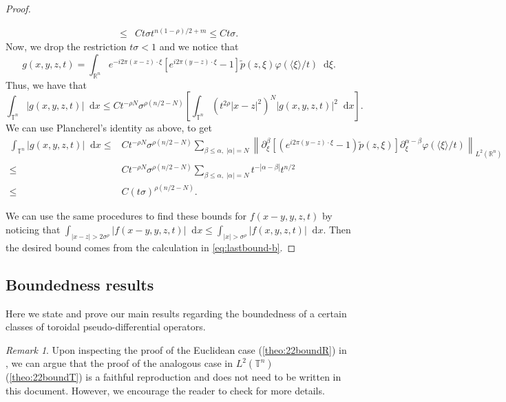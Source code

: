 \documentclass[12pt, reqno]{amsart}
\theoremstyle{definition}
\theoremstyle{remark}
\newtheorem{remark}[theorem]{Remark}
\numberwithin{equation}{section}
\newcommand*\diff{\mathop{}\!\mathrm{d}}
\begin{document}
\begin{proof}
\begin{itemize}
\begin{align*}
            \leq& Ct\sigma t^{n(1-\rho)/2 + m} \leq Ct\sigma.
        \end{align*}
        Now, we drop the restriction $t\sigma<1$ and we notice that
        \begin{equation*}
            g(x, y, z, t) = \int_{\mathbb{R}^n} e^{-i2\pi (x-z) \cdot \xi} \left[ e^{i2\pi (y-z) \cdot \xi} -1 \right]\tilde{p}(z, \xi)\varphi(\langle\xi\rangle/t) \diff \xi.
        \end{equation*}
        Thus, we have that
        \begin{equation*}
            \int_{\mathbb{T}^n} |g(x, y, z, t)|\diff x \leq Ct^{-\rho N}\sigma^{\rho(n/2 - N)} \left[ \int_{\mathbb{T}^n} (t^{2\rho}|x-z|^2)^N|g(x, y, z, t)|^2\diff x \right].
        \end{equation*}
        We can use Plancherel's identity as above, to get
        \begin{align*}
            \int_{\mathbb{T}^n} |g(x, y, z, t)|\diff x \leq & Ct^{-\rho N}\sigma^{\rho(n/2 - N)} \sum_{\beta\leq\alpha,\;|\alpha|=N} \left\| \partial^\beta_\xi \left[ (e^{i2\pi (y-z) \cdot \xi} -1)\tilde{p}(z, \xi) \right] \partial^{\alpha-\beta}_\xi\varphi(\langle\xi\rangle/t) \right\|_{L^2(\mathbb{R}^n)} \\
            \leq& Ct^{-\rho N}\sigma^{\rho(n/2 - N)} \sum_{\beta\leq\alpha,\;|\alpha|=N}t^{-|\alpha-\beta|}t^{n/2} \\
            \leq & C(t\sigma)^{\rho(n/2-N)}.
        \end{align*}
    \end{itemize}
    We can use the same procedures to find these bounds for $f(x-y, y,z, t)$ by noticing that $\int_{|x-z|>2\sigma^\rho} |f(x-y, y,z, t)|\diff x \leq \int_{|x|>\sigma^\rho} |f(x, y,z, t)|\diff x$. Then the desired bound comes from the calculation in \cref{eq:lastbound-b}.
\end{proof}


\subsection{Boundedness results}
\label{section:boundedness}
Here we state and prove our main results regarding the boundedness of a certain classes of toroidal pseudo-differential operators.
\begin{remark}
    Upon inspecting the proof of the Euclidean case (\cref{theo:22boundR}) in \cite{hounie}, we can argue that the proof of the analogous case in $L^2(\mathbb{T}^n)$ (\cref{theo:22boundT}) is a faithful reproduction and does not need to be written in this document. However, we encourage the reader to check \cite{hounie} for more details.
\end{remark}
\end{document}
